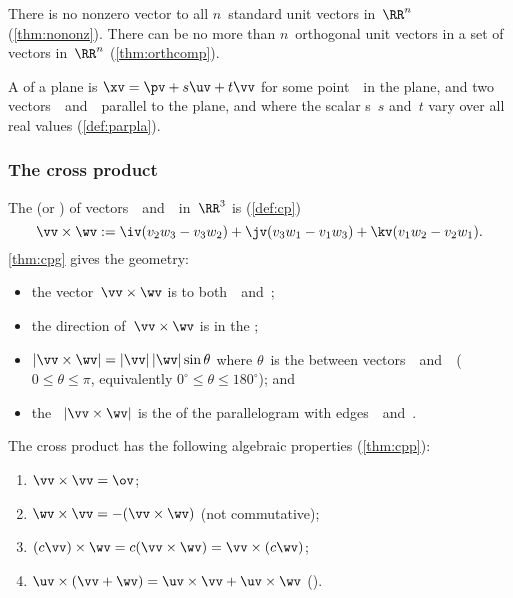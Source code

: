 \begin{itemize}
\itemlo There is no nonzero vector  to all \(n\)~{standard unit vector}s in~\(\RR^n\) (\cref{thm:nononz}).
There can be no more than \(n\)~orthogonal unit vectors in a set of vectors in~\(\RR^n\) (\cref{thm:orthcomp}).

\itemlo A  of a plane is \(\xv=\pv+s\uv+t\vv\) for some point~\pv\ in the plane, and two vectors~\uv\ and~\vv\  parallel to the plane, and where the scalar s~\(s\) and~\(t\) vary over all real values (\cref{def:parpla}).




\subsubsection{The cross product}

\itemhi The   (or ) of vectors~\vv\ and~\wv\ in~\(\RR^3\) is (\cref{def:cp})
\begin{equation*}
\vv\times\wv:=\iv(v_2w_3-v_3w_2)
+\jv(v_3w_1-v_1w_3)
+\kv(v_1w_2-v_2w_1).
\end{equation*}
\cref{thm:cpg} gives the geometry:
\begin{itemize}
\item the vector~\(\vv\times\wv\) is  to both~\vv\ and~\wv;

\item the direction of~\(\vv\times\wv\) is in the ; 

\item \(|\vv\times\wv|=|\vv|\,|\wv|\sin\theta\) where \(\theta\)~is the  between vectors~\vv\ and~\wv\ (\(0\leq\theta\leq\pi\), equivalently \(0^\circ\leq\theta\leq180^\circ\)); and

\item the ~\(|\vv\times\wv|\) is the  of the parallelogram with edges~\vv\ and~\wv.
\end{itemize}

\itemlo The cross product has the following algebraic properties (\cref{thm:cpp}):
\begin{enumerate}
\item \(\vv\times\vv=\ov\);
\item \(\wv\times\vv=-(\vv\times\wv)\) \quad(not commutative);
\item \((c\vv)\times\wv=c(\vv\times\wv)=\vv\times(c\wv)\);
\item \(\uv\times(\vv+\wv)=\uv\times\vv+\uv\times\wv\) \quad().
\end{enumerate}


\end{itemize}

